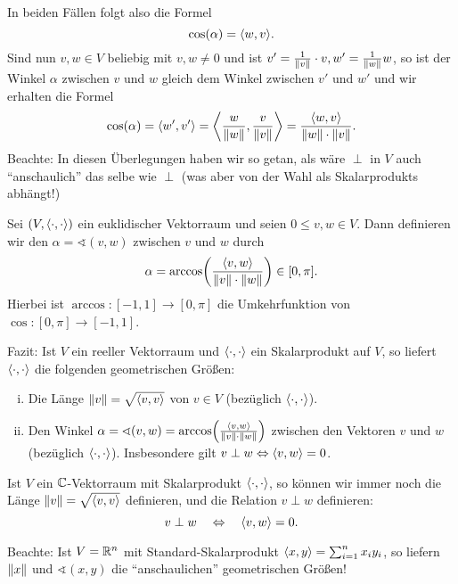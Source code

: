 \begin{bemerkung}
\begin{minipage}{.2\textwidth}
	\end{minipage}
		
		In beiden Fällen folgt also die Formel
		\[
			\cos(\alpha) = \sk{w,v}.
		\]
		Sind nun $v,w \in V$ beliebig mit $v,w \neq 0$ und ist $v' = \frac{1}{\left\lVert v\right\rVert} \cdot v, w' = \frac{1}{\left\lVert w\right\rVert} w$, so ist der Winkel $\alpha$ zwischen $v$ und $w$ gleich dem Winkel zwischen $v'$ und $w'$ und wir erhalten die Formel
		\[
			\cos(\alpha) = \left\langle w',v'\right\rangle = \left\langle\frac{w}{\left\lVert w\right\rVert},\frac{v}{\left\lVert v\right\rVert}\right\rangle = \frac{\left\langle w,v\right\rangle}{\left\lVert w\right\rVert \cdot \left\lVert v\right\rVert}.
		\]
		Beachte: In diesen Überlegungen haben wir so getan, als wäre $\perp$ in $V$ auch \enquote{anschaulich} das selbe wie $\perp$ (was aber von der Wahl als Skalarprodukts abhängt!)

\end{bemerkung}

\begin{definition}[Winkel]
	\label{def:3.15}
	Sei $(V,\left\langle\cdot,\cdot\right\rangle)$ ein euklidischer Vektorraum und seien $0 \leq v,w \in V$.
	Dann definieren wir den  $\alpha = \sphericalangle(v,w)$ zwischen $v$ und $w$ durch
	\[
		\alpha = \arccos \enb{\frac{\sk{v,w}}{\no{v} \cdot \no{w}}} \in [0,\pi].
	\]
	Hierbei ist $\arccos\colon [-1,1] \rightarrow [0,\pi]$ die Umkehrfunktion von $\cos \colon [0,\pi] \rightarrow [-1,1]$.
\end{definition}

Fazit: Ist $V$ ein reeller Vektorraum und $\left\langle\cdot,\cdot\right\rangle$ ein Skalarprodukt auf $V$, so liefert $\left\langle\cdot,\cdot\right\rangle$ die folgenden geometrischen Größen:
\begin{enumerate}[(i)]
	\item Die Länge $\left\lVert v\right\rVert = \sqrt{\left\langle v,v\right\rangle}$ von $v \in V$ (bezüglich $\left\langle\cdot,\cdot\right\rangle$).
	\item Den Winkel $\alpha = \sphericalangle(v,w) = \arccos \enb{\frac{\sk{v,w}}{\no{v} \cdot \no{w}}}$ zwischen den Vektoren $v$ und $w$ (bezüglich $\left\langle\cdot,\cdot\right\rangle$).
	Insbesondere gilt $v \perp w \Leftrightarrow \left\langle v,w\right\rangle = 0$.
\end{enumerate}
Ist $V$ ein $\mathbb{C}$-Vektorraum mit Skalarprodukt $\left\langle\cdot,\cdot\right\rangle$, so können wir immer noch die Länge $\left\lVert v\right\rVert = \sqrt{\left\langle v,v\right\rangle}$ definieren, und die Relation $v \perp w$ definieren:
\[
	v \perp w \quad \Leftrightarrow \quad \left\langle v,w\right\rangle = 0.
\]

Beachte: Ist $V = \mathbb{R}^n$ mit Standard-Skalarprodukt $\left\langle x,y\right\rangle = \sum_{i=1}^{n} x_i y_i$, so liefern $\left\lVert x\right\rVert$ und $\sphericalangle(x,y)$ die \enquote{anschaulichen} geometrischen Größen!
\newpage

